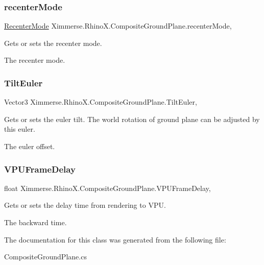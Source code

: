 \subsubsection{\texorpdfstring{recenter\+Mode}{recenterMode}}
{\footnotesize\ttfamily \mbox{\hyperlink{class_ximmerse_1_1_rhino_x_1_1_composite_ground_plane_a04f66929fadbcaaf0d0f9c53cd856dfd}{Recenter\+Mode}} Ximmerse.\+Rhino\+X.\+Composite\+Ground\+Plane.\+recenter\+Mode\hspace{0.3cm}{\ttfamily [get]}, {\ttfamily [set]}}



Gets or sets the recenter mode. 

The recenter mode.\mbox{\label{class_ximmerse_1_1_rhino_x_1_1_composite_ground_plane_a0c19ad531b87d3b3cd8f91f018339a41}} 
\subsubsection{\texorpdfstring{Tilt\+Euler}{TiltEuler}}
{\footnotesize\ttfamily Vector3 Ximmerse.\+Rhino\+X.\+Composite\+Ground\+Plane.\+Tilt\+Euler\hspace{0.3cm}{\ttfamily [get]}, {\ttfamily [set]}}



Gets or sets the euler tilt. The world rotation of ground plane can be adjusted by this euler. 

The euler offset.\mbox{\label{class_ximmerse_1_1_rhino_x_1_1_composite_ground_plane_a7246973f95874588d8e595abfb5dce6c}} 
\subsubsection{\texorpdfstring{V\+P\+U\+Frame\+Delay}{VPUFrameDelay}}
{\footnotesize\ttfamily float Ximmerse.\+Rhino\+X.\+Composite\+Ground\+Plane.\+V\+P\+U\+Frame\+Delay\hspace{0.3cm}{\ttfamily [get]}, {\ttfamily [set]}}



Gets or sets the delay time from rendering to V\+PU. 

The backward time.

The documentation for this class was generated from the following file\+:\begin{DoxyCompactItemize}
\item 
Composite\+Ground\+Plane.\+cs\end{DoxyCompactItemize}
